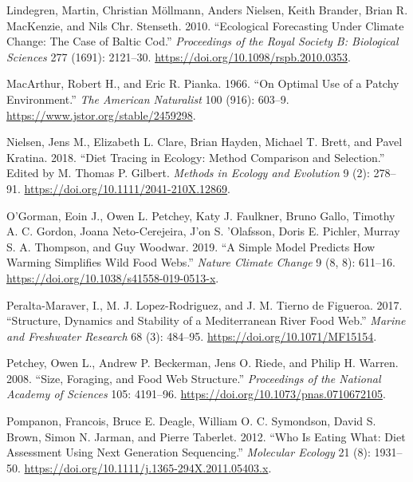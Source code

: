 \documentclass{article}
\newlength{\cslhangindent}
\newlength{\cslentryspacingunit} %
\newenvironment{CSLReferences}[2] %
 {%
  \setlength{\parindent}{0pt}
  \ifodd #1
  \let\oldpar\par
  \def\par{\hangindent=\cslhangindent\oldpar}
  \fi
  \setlength{\parskip}{#2\cslentryspacingunit}
 }%
 {}
\begin{document}
\begin{CSLReferences}{1}{0}
\leavevmode{}%
Lindegren, Martin, Christian Möllmann, Anders Nielsen, Keith Brander,
Brian R. MacKenzie, and Nils Chr. Stenseth. 2010. {``Ecological
Forecasting Under Climate Change: The Case of {Baltic} Cod.''}
\emph{Proceedings of the Royal Society B: Biological Sciences} 277
(1691): 2121--30. \url{https://doi.org/10.1098/rspb.2010.0353}.

\leavevmode{}%
MacArthur, Robert H., and Eric R. Pianka. 1966. {``On {Optimal Use} of a
{Patchy Environment}.''} \emph{The American Naturalist} 100 (916):
603--9. \url{https://www.jstor.org/stable/2459298}.

\leavevmode{}%
Nielsen, Jens M., Elizabeth L. Clare, Brian Hayden, Michael T. Brett,
and Pavel Kratina. 2018. {``Diet Tracing in Ecology: Method Comparison
and Selection.''} Edited by M. Thomas P. Gilbert. \emph{Methods in
Ecology and Evolution} 9 (2): 278--91.
\url{https://doi.org/10.1111/2041-210X.12869}.

\leavevmode{}%
O'Gorman, Eoin J., Owen L. Petchey, Katy J. Faulkner, Bruno Gallo,
Timothy A. C. Gordon, Joana Neto-Cerejeira, J'on S. 'Olafsson, Doris E.
Pichler, Murray S. A. Thompson, and Guy Woodwar. 2019. {``A Simple Model
Predicts How Warming Simplifies Wild Food Webs.''} \emph{Nature Climate
Change} 9 (8, 8): 611--16.
\url{https://doi.org/10.1038/s41558-019-0513-x}.

\leavevmode{}%
Peralta-Maraver, I., M. J. Lopez-Rodriguez, and J. M. Tierno de
Figueroa. 2017. {``Structure, Dynamics and Stability of a
{Mediterranean} River Food Web.''} \emph{Marine and Freshwater Research}
68 (3): 484--95. \url{https://doi.org/10.1071/MF15154}.

\leavevmode{}%
Petchey, Owen L., Andrew P. Beckerman, Jens O. Riede, and Philip H.
Warren. 2008. {``Size, Foraging, and Food Web Structure.''}
\emph{Proceedings of the National Academy of Sciences} 105: 4191--96.
\url{https://doi.org/10.1073/pnas.0710672105}.

\leavevmode{}%
Pompanon, Francois, Bruce E. Deagle, William O. C. Symondson, David S.
Brown, Simon N. Jarman, and Pierre Taberlet. 2012. {``Who Is Eating
What: Diet Assessment Using Next Generation Sequencing.''}
\emph{Molecular Ecology} 21 (8): 1931--50.
\url{https://doi.org/10.1111/j.1365-294X.2011.05403.x}.


\end{CSLReferences}
\end{document}
